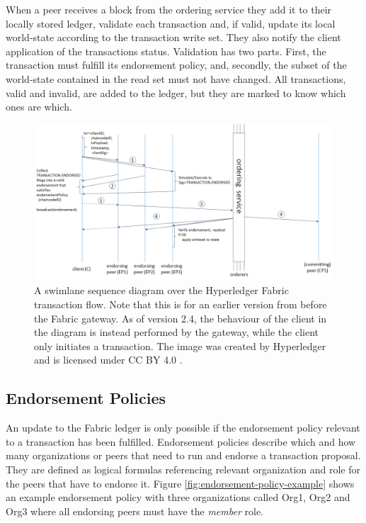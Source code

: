 \documentclass[english, biblatex, digitaloutput]{kththesis}
\begin{document}
When a peer receives a block from the ordering service they add it to their locally stored ledger, validate each transaction and, if valid, update its local world-state according to the transaction write set. They also notify the client application of the transactions status. Validation has two parts. First, the transaction must fulfill its endorsement policy, and, secondly, the subset of the world-state contained in the read set must not have changed. All transactions, valid and invalid, are added to the ledger, but they are marked to know which ones are which.

\begin{figure}
	\begin{center}
		\includegraphics[width=\textwidth]{figures/fabric_transaction_flow.png}
	\end{center}
	\caption{A swimlane sequence diagram over the Hyperledger Fabric transaction flow. Note that this is for an earlier version from before the Fabric gateway. As of version 2.4, the behaviour of the client in the diagram is instead performed by the gateway, while the client only initiates a transaction. The image \cite{hyperledger_transaction-flow_nodate}  was created by Hyperledger and is licensed under CC BY 4.0 \cite{noauthor_creative_nodate}.}
	\label{fig:fabric-transaction-flow}
\end{figure}

\subsection{Endorsement Policies}

An update to the Fabric ledger is only possible if the endorsement policy relevant to a transaction has been fulfilled. Endorsement policies describe which and how many organizations or peers that need to run and endorse a transaction proposal. They are defined as logical formulas referencing relevant organization and role for the peers that have to endorse it. Figure \ref{fig:endorsement-policy-example} shows an example endorsement policy with three organizations called Org1, Org2 and Org3 where all endorsing peers must have the \textit{member} role.
\end{document}
